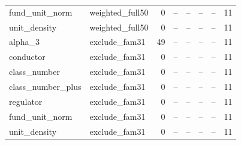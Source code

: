 \begin{tabular}{llrrrrrr}
fund\_unit\_norm & weighted\_full50 & 0 & -- & -- & -- & -- & 11 \\
unit\_density & weighted\_full50 & 0 & -- & -- & -- & -- & 11 \\
alpha\_3 & exclude\_fam31 & 49 & -- & -- & -- & -- & 11 \\
conductor & exclude\_fam31 & 0 & -- & -- & -- & -- & 11 \\
class\_number & exclude\_fam31 & 0 & -- & -- & -- & -- & 11 \\
class\_number\_plus & exclude\_fam31 & 0 & -- & -- & -- & -- & 11 \\
regulator & exclude\_fam31 & 0 & -- & -- & -- & -- & 11 \\
fund\_unit\_norm & exclude\_fam31 & 0 & -- & -- & -- & -- & 11 \\
unit\_density & exclude\_fam31 & 0 & -- & -- & -- & -- & 11 \\
\hline
\end{tabular}
